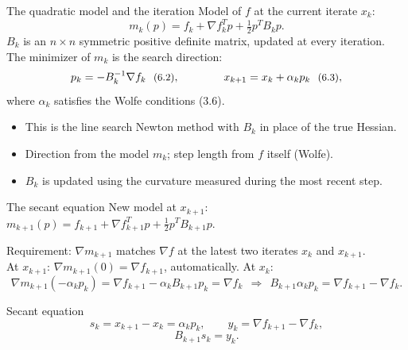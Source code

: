\documentclass[aspectratio=169,12pt]{beamer}
\newcommand{\gradf}{\nabla f}
\newcommand{\eqn}[1]{\text{\small(#1)}}
\begin{document}
\begin{frame}{The quadratic model and the iteration}
  Model of $f$ at the current iterate $x_{k}$:
  \[ m_{k}(p)=f_{k}+\gradf_{k}^{T}p+\tfrac12p^{T}B_{k}p . \tag{6.1} \]
  $B_{k}$ is an $n\times n$ symmetric positive definite matrix, \alert{updated} at every
  iteration. The minimizer of $m_{k}$ is the search direction:
  \[
    p_{k}=-B_{k}^{-1}\gradf_{k}\ \ \eqn{6.2},
    \qquad\qquad
    x_{k+1}=x_{k}+\alpha_{k}p_{k}\ \ \eqn{6.3},
  \]
  where $\alpha_{k}$ satisfies the Wolfe conditions (3.6).

  \vspace{0.2em}
  \begin{itemize}\setlength\itemsep{0.25em}
    \item This is the line search Newton method with $B_{k}$ in place of the true Hessian.
    \item Direction from the model $m_{k}$; step length from $f$ itself (Wolfe).
    \item $B_{k}$ is updated using the curvature measured during the most recent step.
  \end{itemize}
\end{frame}

\begin{frame}{The secant equation}
  New model at $x_{k+1}$:\quad
  $m_{k+1}(p)=f_{k+1}+\gradf_{k+1}^{T}p+\tfrac12p^{T}B_{k+1}p$.

  \vspace{0.3em}
  Requirement: $\nabla m_{k+1}$ matches $\gradf$ at the latest two iterates $x_{k}$ and $x_{k+1}$.\\
  At $x_{k+1}$: $\nabla m_{k+1}(0)=\gradf_{k+1}$, automatically. At $x_{k}$:
  \[
    \nabla m_{k+1}(-\alpha_{k}p_{k})=\gradf_{k+1}-\alpha_{k}B_{k+1}p_{k}=\gradf_{k}
    \ \ \Longrightarrow\ \
    B_{k+1}\alpha_{k}p_{k}=\gradf_{k+1}-\gradf_{k} .
    \tag{6.4}
  \]

  \begin{block}{Secant equation}
    \[ s_{k}=x_{k+1}-x_{k}=\alpha_{k}p_{k},\qquad y_{k}=\gradf_{k+1}-\gradf_{k}, \tag{6.5} \]
    \[ B_{k+1}s_{k}=y_{k} . \tag{6.6} \]
  \end{block}
\end{frame}
\end{document}
